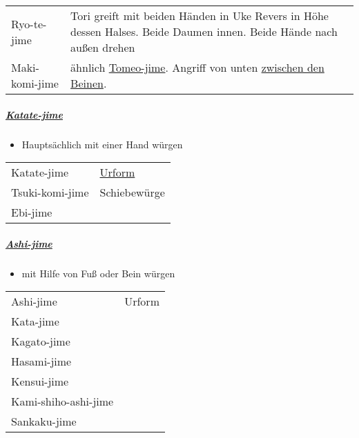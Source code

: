 \documentclass[justified, a4paper, notitlepage, captions=tableheading, nobib]{tufte-handout}
\begin{document}
\begin{center}
\begin{tabular}{ll}
\label{org4a903d9}Ryo-te-jime & Tori greift mit beiden Händen in Uke Revers in Höhe dessen Halses. Beide Daumen innen. Beide Hände nach außen drehen\\
\label{org1c622bc}Maki-komi-jime & ähnlich \hyperref[org867e597]{Tomeo-jime}. Angriff von unten \hyperref[orgf285c69]{zwischen den Beinen}.\\
\end{tabular}
\end{center}

\subparagraph{\hyperref[org32dff1c]{Katate-jime}}
\label{sec:orgc01f2c9}

\begin{itemize}
\item Hauptsächlich mit einer Hand würgen
\end{itemize}

\begin{center}
\begin{tabular}{ll}
\label{org32dff1c}Katate-jime & \href{https://www.youtube.com/watch?v=aKEQKdlSjlE}{Urform}\\
\label{org261b858}Tsuki-komi-jime & \label{orgd9c7b9d}Schiebewürge\\
\label{org0b9fbf3}Ebi-jime & \\
\end{tabular}
\end{center}

\subparagraph{\hyperref[org38d0b98]{Ashi-jime}}
\label{sec:orgb0ec835}

\begin{itemize}
\item mit Hilfe von Fuß oder Bein würgen
\end{itemize}

\begin{center}
\begin{tabular}{ll}
\label{org38d0b98}Ashi-jime & Urform\\
\label{org3d470a4}Kata-jime & \\
\label{org1a42ea5}Kagato-jime & \\
\label{org36abe31}Hasami-jime & \\
\label{org6f43177}Kensui-jime & \\
\label{org0729e4e}Kami-shiho-ashi-jime & \\
\label{org39ec342}Sankaku-jime & \\
\end{tabular}
\end{center}
\end{document}
